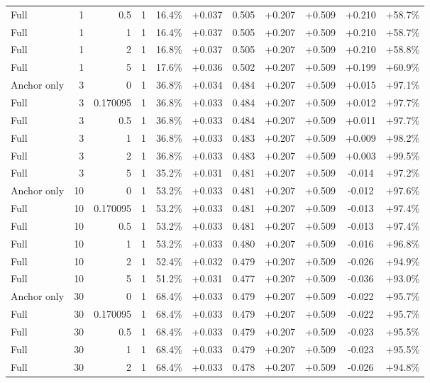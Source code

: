 \begin{table}[htbp]
\begin{tabular}{lrrrccccccc}
Full & 1 & 0.5 & 1 & 16.4\% & +0.037 & 0.505 & +0.207 & +0.509 & +0.210 & +58.7\% \\
Full & 1 & 1 & 1 & 16.4\% & +0.037 & 0.505 & +0.207 & +0.509 & +0.210 & +58.7\% \\
Full & 1 & 2 & 1 & 16.8\% & +0.037 & 0.505 & +0.207 & +0.509 & +0.210 & +58.8\% \\
Full & 1 & 5 & 1 & 17.6\% & +0.036 & 0.502 & +0.207 & +0.509 & +0.199 & +60.9\% \\
Anchor only & 3 & 0 & 1 & 36.8\% & +0.034 & 0.484 & +0.207 & +0.509 & +0.015 & +97.1\% \\
Full & 3 & 0.170095 & 1 & 36.8\% & +0.033 & 0.484 & +0.207 & +0.509 & +0.012 & +97.7\% \\
Full & 3 & 0.5 & 1 & 36.8\% & +0.033 & 0.484 & +0.207 & +0.509 & +0.011 & +97.7\% \\
Full & 3 & 1 & 1 & 36.8\% & +0.033 & 0.483 & +0.207 & +0.509 & +0.009 & +98.2\% \\
Full & 3 & 2 & 1 & 36.8\% & +0.033 & 0.483 & +0.207 & +0.509 & +0.003 & +99.5\% \\
Full & 3 & 5 & 1 & 35.2\% & +0.031 & 0.481 & +0.207 & +0.509 & -0.014 & +97.2\% \\
Anchor only & 10 & 0 & 1 & 53.2\% & +0.033 & 0.481 & +0.207 & +0.509 & -0.012 & +97.6\% \\
Full & 10 & 0.170095 & 1 & 53.2\% & +0.033 & 0.481 & +0.207 & +0.509 & -0.013 & +97.4\% \\
Full & 10 & 0.5 & 1 & 53.2\% & +0.033 & 0.481 & +0.207 & +0.509 & -0.013 & +97.4\% \\
Full & 10 & 1 & 1 & 53.2\% & +0.033 & 0.480 & +0.207 & +0.509 & -0.016 & +96.8\% \\
Full & 10 & 2 & 1 & 52.4\% & +0.032 & 0.479 & +0.207 & +0.509 & -0.026 & +94.9\% \\
Full & 10 & 5 & 1 & 51.2\% & +0.031 & 0.477 & +0.207 & +0.509 & -0.036 & +93.0\% \\
Anchor only & 30 & 0 & 1 & 68.4\% & +0.033 & 0.479 & +0.207 & +0.509 & -0.022 & +95.7\% \\
Full & 30 & 0.170095 & 1 & 68.4\% & +0.033 & 0.479 & +0.207 & +0.509 & -0.022 & +95.7\% \\
Full & 30 & 0.5 & 1 & 68.4\% & +0.033 & 0.479 & +0.207 & +0.509 & -0.023 & +95.5\% \\
Full & 30 & 1 & 1 & 68.4\% & +0.033 & 0.479 & +0.207 & +0.509 & -0.023 & +95.5\% \\
Full & 30 & 2 & 1 & 68.4\% & +0.033 & 0.478 & +0.207 & +0.509 & -0.026 & +94.8\% \\

\end{tabular}
\end{table}
